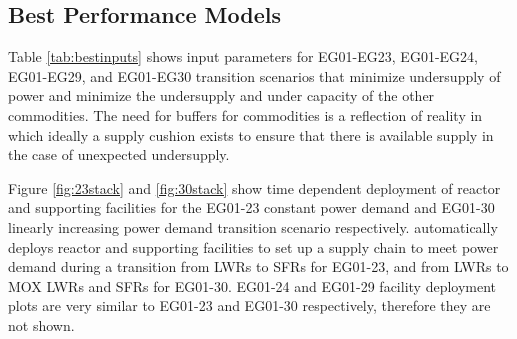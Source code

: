 \subsection{Best Performance Models}
Table \ref{tab:bestinputs} 
shows \deploy input parameters for
EG01-EG23, EG01-EG24, EG01-EG29, and EG01-EG30 transition scenarios
that minimize undersupply of power and minimize 
the undersupply and under capacity of the other commodities. 
The need for buffers for commodities is a reflection of reality
in which ideally a supply cushion exists to ensure that there 
is available supply in the case of unexpected undersupply. 

Figure \ref{fig:23stack} and \ref{fig:30stack} show
time dependent deployment of reactor and supporting facilities for 
the EG01-23 constant power demand and EG01-30 linearly increasing power demand 
transition scenario respectively. 
\deploy automatically deploys reactor and supporting facilities 
to set up a supply chain to meet power demand
during a transition from \glspl{LWR} to \glspl{SFR} for EG01-23, 
and from \glspl{LWR} to \gls{MOX} \glspl{LWR} and \glspl{SFR} for 
EG01-30. 
EG01-24 and EG01-29 facility deployment plots are very similar to 
EG01-23 and EG01-30 respectively, therefore they are not shown. 

